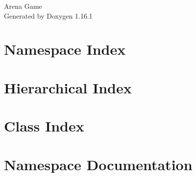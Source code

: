 \documentclass[twoside]{book}
\newcommand{\+}{\discretionary{\mbox{\scriptsize$\hookleftarrow$}}{}{}}
\newcommand{\clearemptydoublepage}{%
    \newpage{\pagestyle{empty}\cleardoublepage}%
  }
\begin{document}
  \raggedbottom
    \hypersetup{pageanchor=false,
                bookmarksnumbered=true,
                pdfencoding=unicode
               }
  \begin{titlepage}
  \vspace*{7cm}
  \begin{center}%
  {\Large Arena Game}\\
  \vspace*{1cm}
  {\large Generated by Doxygen 1.16.1}\\
  \end{center}
  \end{titlepage}
  \clearemptydoublepage
  \tableofcontents
  \clearemptydoublepage
  \hypersetup{pageanchor=true}
\chapter{Namespace Index}

\chapter{Hierarchical Index}

\chapter{Class Index}

\chapter{Namespace Documentation}

















\end{document}
